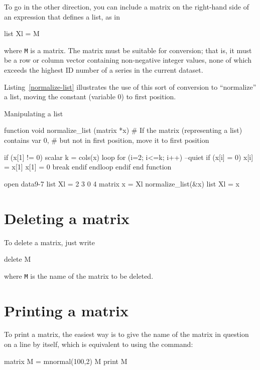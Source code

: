 To go in the other direction, you can include a matrix on the
right-hand side of an expression that defines a list, as in
%
\begin{code}
list Xl = M
\end{code}
%
where \texttt{M} is a matrix.  The matrix must be suitable for
conversion; that is, it must be a row or column vector containing
non-negative integer values, none of which exceeds the highest ID
number of a series in the current dataset.

Listing~\ref{normalize-list} illustrates the use of this sort of
conversion to ``normalize'' a list, moving the constant (variable 0)
to first position.

\begin{script}[htbp]
  \caption{Manipulating a list}
  \label{normalize-list}
\begin{scode}
function void normalize_list (matrix *x)
  # If the matrix (representing a list) contains var 0,
  # but not in first position, move it to first position

  if (x[1] != 0)
     scalar k = cols(x)
     loop for (i=2; i<=k; i++) --quiet
        if (x[i] = 0)
            x[i] = x[1]
            x[1] = 0
            break
         endif
     endloop
  endif
end function

open data9-7
list Xl = 2 3 0 4
matrix x = Xl
normalize_list(&x)
list Xl = x
\end{scode}
\end{script}


\section{Deleting a matrix}
\label{matrix-delete}

To delete a matrix, just write
%
\begin{code}
delete M
\end{code}
%
where \texttt{M} is the name of the matrix to be deleted.

\section{Printing a matrix}

To print a matrix, the easiest way is to give the name of the matrix
in question on a line by itself, which is equivalent to using the
 command:
%
\begin{code}
matrix M = mnormal(100,2)
M
print M
\end{code}

